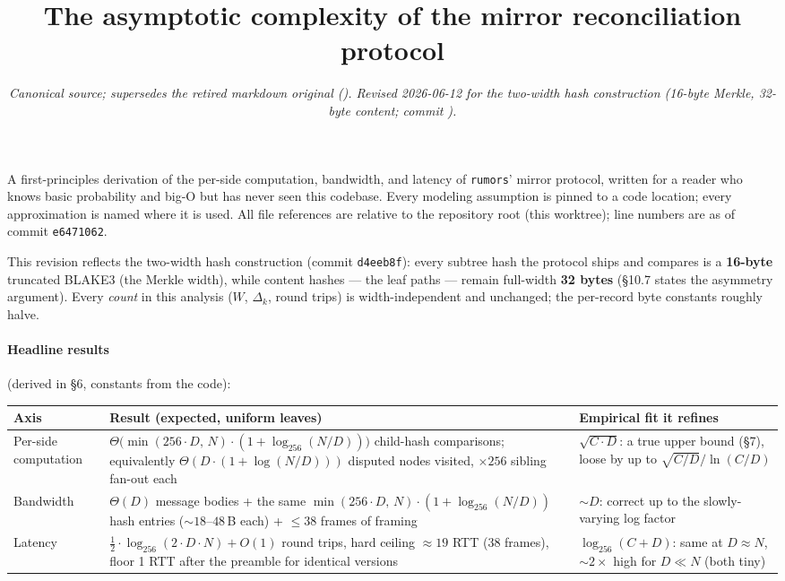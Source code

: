 \documentclass[11pt]{article}
\title{The asymptotic complexity of the mirror reconciliation protocol}
\author{}
\date{\normalsize\itshape Canonical source; supersedes the retired markdown
original (\code{results/mirror-complexity.md}). Revised 2026-06-12 for the
two-width hash construction (16-byte Merkle, 32-byte content; commit
\code{d4eeb8f}).}
\newcommand{\code}[1]{\texttt{#1}}
\theoremstyle{plain}
\begin{document}
\maketitle

A first-principles derivation of the per-side computation, bandwidth, and
latency of \code{rumors}' mirror protocol, written for a reader who knows
basic probability and big-O but has never seen this codebase. Every modeling
assumption is pinned to a code location; every approximation is named where
it is used. All file references are relative to the repository root (this
worktree); line numbers are as of commit \code{e6471062}.

This revision reflects the two-width hash construction (commit
\code{d4eeb8f}): every subtree hash the protocol ships and compares is a
\textbf{16-byte} truncated BLAKE3 (the Merkle width), while content
hashes --- the leaf paths --- remain full-width \textbf{32 bytes} (\S10.7
states the asymmetry argument). Every \emph{count} in this analysis ($W$,
$\Delta_k$, round trips) is width-independent and unchanged; the
per-record byte constants roughly halve.

\paragraph{Headline results} (derived in \S6, constants from the code):

\begin{center}
\begin{tabular}{@{}L{0.16\textwidth}L{0.46\textwidth}L{0.28\textwidth}@{}}
\toprule
Axis & Result (expected, uniform leaves) & Empirical fit it refines \\
\midrule
Per-side computation &
$\Theta\bigl(\min(256 \cdot D,\, N) \cdot (1 + \log_{256}(N/D))\bigr)$
child-hash comparisons; equivalently $\Theta(D \cdot (1 + \log(N/D)))$
disputed nodes visited, $\times 256$ sibling fan-out each &
$\sqrt{C \cdot D}$: a true upper bound (\S7), loose by up to
$\sqrt{C/D}/\ln(C/D)$ \\
\addlinespace
Bandwidth &
$\Theta(D)$ message bodies + the same
$\min(256 \cdot D,\, N) \cdot (1 + \log_{256}(N/D))$ hash entries
(${\sim}18$--$48$\,B each) + $\le 38$ frames of framing &
${\sim}D$: correct up to the slowly-varying log factor \\
\addlinespace
Latency &
$\tfrac{1}{2} \cdot \log_{256}(2 \cdot D \cdot N) + O(1)$ round trips, hard
ceiling $\approx 19$ RTT (38 frames), floor 1 RTT after the preamble for
identical versions &
$\log_{256}(C + D)$: same at $D \approx N$, ${\sim}2\times$ high for
$D \ll N$ (both tiny) \\
\bottomrule
\end{tabular}
\end{center}
\end{document}
